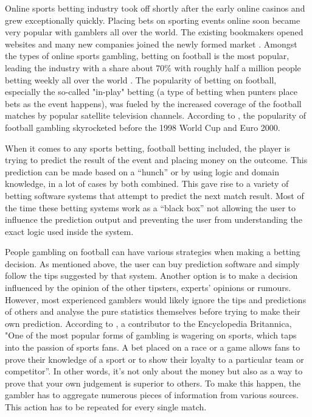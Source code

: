 Online sports betting industry took off shortly after the early online casinos and grew exceptionally quickly. Placing bets on sporting events online soon became very popular with gamblers all over the world. The existing bookmakers opened websites and many new companies joined the newly formed market \citep{source:gamblingsites}. Amongst the types of online sports gambling, betting on football is the most popular, leading the industry with a share about 70\% with roughly half a million people betting weekly all over the world \citep{footballbettinggamblingindustry}. The popularity of betting on football, especially the so-called "in-play" betting (a type of betting when punters place bets as the event happens), was fueled by the increased coverage of the football matches by popular satellite television channels. According to \citet{footballbettinggamblingindustry}, the popularity of football gambling skyrocketed before the 1998 World Cup and Euro 2000.

When it comes to any sports betting, football betting included, the player is trying to predict the result of the event and placing money on the outcome. This prediction can be made based on a “hunch” or by using logic and domain knowledge, in a lot of cases by both combined. This gave rise to a variety of betting software systems that attempt to predict the next match result. Most of the time these betting systems work as a “black box” not allowing the user to influence the prediction output and preventing the user from understanding the exact logic used inside the system.

People gambling on football can have various strategies when making a betting decision. As mentioned above, the user can buy prediction software and simply follow the tips suggested by that system. Another option is to make a decision influenced by the opinion of the other tipsters, experts’ opinions or rumours. However, most experienced gamblers would likely ignore the tips and predictions of others and analyse the pure statistics themselves before trying to make their own prediction. According to \citet{britannica2015gamblingandsports}, a contributor to the Encyclopedia Britannica, "One of the most popular forms of gambling is wagering on sports, which taps into the passion of sports fans. A bet placed on a race or a game allows fans to prove their knowledge of a sport or to show their loyalty to a particular team or competitor”. In other words, it’s not only about the money but also as a way to prove that your own judgement is superior to others. To make this happen, the gambler has to aggregate numerous pieces of information from various sources. This action has to be repeated for every single match.

